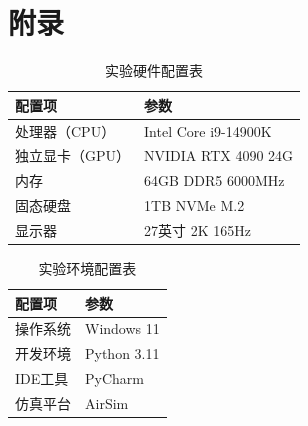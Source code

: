 
\clearpage
\chapter*{附录}


\begin{table}[H]
\centering
\caption{实验硬件配置表}
\label{tab:appendix-hardware}
\begin{tabular}{ll}
\toprule
配置项 & 参数 \\
\midrule
处理器（CPU） & Intel Core i9-14900K \\
独立显卡（GPU） & NVIDIA RTX 4090 24G \\
内存 & 64GB DDR5 6000MHz \\
固态硬盘 & 1TB NVMe M.2 \\
显示器 & 27英寸 2K 165Hz \\
\bottomrule
\end{tabular}
\end{table}

\begin{table}[H]
\centering
\caption{实验环境配置表}
\label{tab:appendix-env}
\begin{tabular}{ll}
\toprule
配置项 & 参数 \\
\midrule
操作系统 & Windows 11 \\
开发环境 & Python 3.11 \\
IDE工具 & PyCharm \\
仿真平台 & AirSim \\
\bottomrule
\end{tabular}
\end{table}

